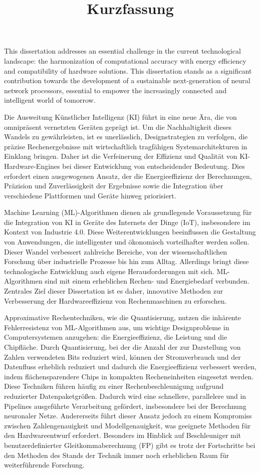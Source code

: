 \documentclass{article}
\begin{document}
This dissertation addresses an essential challenge in the current technological landscape: the harmonization of computational accuracy with energy efficiency and compatibility of hardware solutions. This dissertation stands as a significant contribution towards the development of a sustainable next-generation of neural network processors, essential to empower the increasingly connected and intelligent world of tomorrow.

\newpage
\title{\textbf{Kurzfassung}}

\thispagestyle{empty}

Die Ausweitung K\"unstlicher Intelligenz (KI) f\"uhrt in eine neue \"Ara, die von omnipr\"asent  vernetzten Ger\"aten gepr\"agt ist. Um die Nachhaltigkeit dieses Wandels zu gew\"ahrleisten, ist es unerl\"asslich, Designstrategien zu verfolgen, die pr\"azise Rechenergebnisse mit wirtschaftlich tragf\"ahigen Systemarchitekturen in Einklang bringen. Daher ist die Verfeinerung der Effizienz und Qualit\"at von KI-Hardware-Engines bei dieser Entwicklung von entscheidender Bedeutung. Dies erfordert einen ausgewogenen Ansatz, der die Energieeffizienz der Berechnungen, Pr\"azision und Zuverl\"assigkeit der Ergebnisse sowie die Integration \"uber verschiedene Plattformen und Ger\"ate hinweg priorisiert.

Machine Learning (ML)-Algorithmen dienen als grundlegende Voraussetzung f\"ur die Integration von KI in Ger\"ate des Internets der Dinge (IoT), insbesondere im Kontext von Industrie 4.0. Diese Weiterentwicklungen beeinflussen die Gestaltung von Anwendungen, die intelligenter und \"okonomisch vorteilhafter werden sollen. Dieser Wandel verbessert zahlreiche Bereiche, von der wissenschaftlichen Forschung \"uber industrielle Prozesse bis hin zum Alltag. Allerdings bringt diese technologische Entwicklung auch eigene Herausforderungen mit sich. ML-Algorithmen sind mit einem erheblichen Rechen- und Energiebedarf verbunden. Zentrales Ziel dieser Dissertation ist es daher, innovative Methoden zur Verbesserung der Hardwareeffizienz von Rechenmaschinen zu erforschen.

Approximative Rechentechniken, wie die Quantisierung, nutzen die inh\"arente Fehlerresistenz von ML-Algorithmen aus, um wichtige Designprobleme in Computersystemen anzugehen: die Energieeffizienz, die Leistung und die Chipfl\"ache. Durch Quantisierung, bei der die Anzahl der zur Darstellung von Zahlen verwendeten Bits reduziert wird, k\"onnen der Stromverbrauch und der Datenfluss erheblich reduziert und dadurch die Energieeffizienz verbessert werden, indem fl\"achensparendere Chips in kompakten Recheneinheiten eingesetzt werden. Diese Techniken f\"uhren h\"aufig zu einer Rechenbeschleunigung aufgrund reduzierter Datenpaketgr\"o\ss{}en. Dadurch wird eine schnellere, parallelere und in Pipelines ausgef\"uhrte Verarbeitung gef\"ordert, insbesondere bei der Berechnung neuronaler Netze. Andererseits f\"uhrt dieser Ansatz jedoch zu einem Kompromiss zwischen Zahlengenauigkeit und Modellgenauigkeit, was geeignete Methoden f\"ur den Hardwareentwurf erfordert. Besonders im Hinblick auf Beschleuniger mit benutzerdefinierter Gleitkommaberechnung (FP) gibt es trotz der Fortschritte bei den Methoden des Stands der Technik immer noch erheblichen Raum f\"ur weiterf\"uhrende Forschung.
\end{document}
